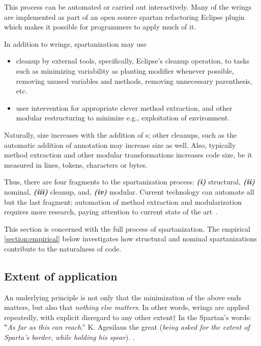 This process can be automated or carried out interactively. Many of the wrings
are implemented as part of an open source spartan refactoring Eclipse
plugin which
makes it possible for programmers to apply much of it.

In addition to wrings, spartanization may use
\begin{itemize}
    \item cleanup by external tools, specifically, Eclipse's cleanup operation,
      to tasks such as minimizing variability as planting  modifier
      whenever possible, removing unused variables and methods, removing
      unnecessary parenthesis, etc.
    \item user intervention for appropriate
        clever method extraction, and other modular restructuring to
        minimize e.g., exploitation of environment.
\end{itemize}
Naturally, size increases with the addition of s; other cleanups, such
as the automatic addition of  annotation may increase size as well.
Also, typically method extraction and other modular transformations increases
code size, be it measured in lines, tokens, characters or bytes.

Thus, there are four fragments to the spartanization process:
\emph{\textbf{(i)}} structural,
\emph{\textbf{(ii)}} nominal,
\emph{\textbf{(iii)}} cleanup, and,
\emph{\textbf{(iv)}} modular.
Current technology can automate all but the last fragment;
automation of method extraction and modularization requires more research,
paying attention to current state of the
art~\cite{Griswold:Chen:Morison:Bowdidge:1998,Holmes:Murphy:2005}.  

This section is concerned with the full process of spartanization.
The empirical \cref{section:empirical} below investigates how structural and
nominal spartanizations contribute to the naturalness of code.

\subsection{Extent of application}
\label{section:extent}
An underlying principle is not only that the minimization of
the above ends matters, but also that \emph{nothing else matters}.
In other words, wrings are applied repeatedly, with explicit disregard
to any other extent†{%
  In the Spartan's words: ‟\textit{As far as this can reach}.” K. Agesilaus the
  great (\textsl{being asked for the extent of Sparta's border, while
  holding his spear}).
}.

